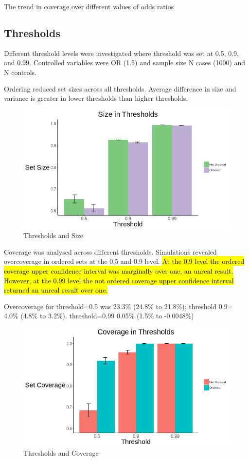 The trend in coverage over different values of odds ratios 


\subsection{Thresholds}
Different threshold levels were investigated where threshold was set at 0.5, 0.9, and 0.99. Controlled variables were OR (1.5) and 
sample size N cases (1000) and N controls. 

Ordering reduced set sizes across all thresholds. Average difference in size and variance is greater in lower thresholds than higher thresholds.

\begin{figure}[H]
\centering
\includegraphics[scale=0.625]{images/Barplots/Thr_Size.png}
\caption{Thresholds and Size}
\label{fig: Thr_Size}
\end{figure}

Coverage was analysed across different thresholds. Simulations revealed overcoverage in ordered sets at the 0.5 and 0.9 level. \hl{At the 0.9 level the ordered coverage upper confidence interval was marginally over one, an unreal result. However, at the 0.99 level the not ordered coverage upper confidence interval returned an unreal result over one.}

Overcoverage for threshold=0.5 was 23.3\% (24.8\% to 21.8\%); threshold 0.9= 4.0\% (4.8\% to 3.2\%). threshold=0.99 0.05\% (1.5\% to -0.0048\%)

\begin{figure}[H]
\centering
\includegraphics[scale=0.625]{images/Barplots/Thr_Cov.png}
\caption{Thresholds and Coverage}
\label{Thr_Cov}
\end{figure}


